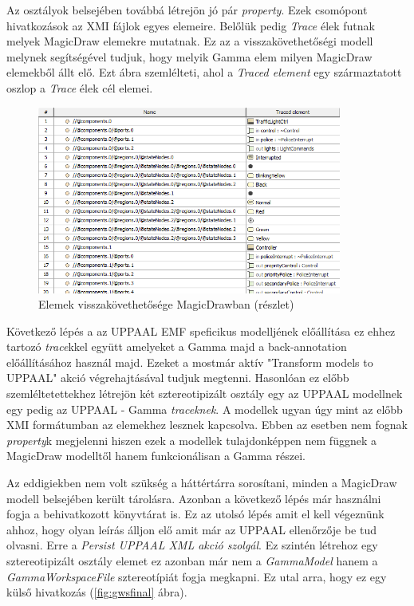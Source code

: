 Az osztályok belsejében továbbá létrejön jó pár \emph{property}. Ezek csomópont hivatkozások az XMI fájlok egyes elemeire. Belőlük pedig \emph{Trace} élek futnak melyek MagicDraw elemekre mutatnak. Ez az a visszakövethetőségi modell melynek segítségével tudjuk, hogy melyik Gamma elem milyen MagicDraw elemekből állt elő. Ezt  ábra szemlélteti, ahol a \emph{Traced element} egy származtatott oszlop a \emph{Trace} élek cél elemei.

\begin{figure}[!ht]
	\centering
	\includegraphics[width=10cm, keepaspectratio]{figures/contribution/Traces.png}
	\caption{Elemek visszakövethetősége MagicDrawban (részlet)}
	\label{fig:traces}
\end{figure}

Következő lépés a az UPPAAL EMF speficikus modelljének előállítása  ez ehhez tartozó \emph{trace}kkel együtt amelyeket a Gamma majd a back-annotation előállításához használ majd. Ezeket a mostmár aktív "Transform models to UPPAAL" akció végrehajtásával tudjuk megtenni. Hasonlóan ez előbb szemléltetettekhez létrejön két sztereotipizált osztály egy az UPPAAL modellnek egy pedig az UPPAAL - Gamma \emph{traceknek}. A modellek ugyan úgy mint az előbb XMI formátumban az elemekhez lesznek kapcsolva. Ebben az esetben nem fognak \emph{property}k megjelenni hiszen ezek a modellek tulajdonképpen nem függnek a MagicDraw modelltől hanem funkcionálisan a Gamma részei.

Az eddigiekben nem volt szükség a háttértárra sorosítani, minden a MagicDraw modell belsejében került tárolásra. Azonban a következő lépés már használni fogja a behivatkozott könyvtárat is. Ez az utolsó lépés amit el kell végeznünk ahhoz, hogy olyan leírás álljon elő amit már az UPPAAL ellenőrzője be tud olvasni. Erre a \emph{Persist UPPAAL XML akció szolgál}. Ez szintén létrehoz egy sztereotipizált osztály elemet ez azonban már nem a \emph{GammaModel} hanem a \emph{GammaWorkspaceFile} sztereotípiát fogja megkapni. Ez utal arra, hogy ez egy külső hivatkozás (\ref{fig:gwsfinal} ábra).

